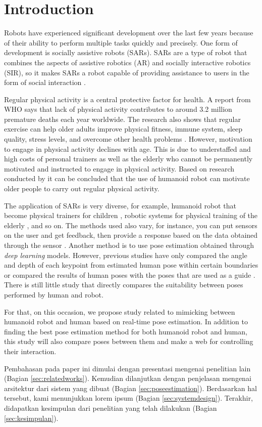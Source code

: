 \section{Introduction}
\label{sec:introduction}


Robots have experienced significant development over the last few years 
because of their ability to perform multiple tasks quickly and precisely.
One form of development is socially assistive robots (SARs). 
SARs are a type of robot that combines the aspects of assistive robotics (AR)
and socially interactive robotics (SIR), so it makes SARs a robot capable of providing assistance to users in the form of social interaction \citep{feil2005}.

Regular physical activity is a central protective factor for health.
A report from WHO says that lack of physical activity contributes to around 3.2 million premature deaths each year worldwide.
The research also shows that regular exercise can help older adults improve physical fitness, immune system, sleep quality, stress levels, and overcome other health problems \citep{lotfi2018}.
However, motivation to engage in physical activity declines with age. 
This is due to understaffed and high costs of personal trainers as well as the elderly who cannot be permanently motivated and instructed to engage in physical activity.
Based on research conducted by \citet{ruf2020} it can be concluded that the use of humanoid robot can motivate older people to carry out regular physical activity.

The application of SARs is very diverse, for example, humanoid robot that become physical trainers for children \citep{güneysu2017}, 
robotic systems for physical training of the elderly \citep{avioz2021}, and so on. The methods used also vary, for instance, 
you can put sensors on the user and get feedback, then provide a response based on the data obtained through the sensor \citep{güneysu2017}. 
Another method is to use pose estimation obtained through \emph{deep learning} models.
However, previous studies have only compared the angle and depth of each keypoint from estimated human pose within certain boundaries or compared the results of human poses with the poses that are used as a guide \citep{romeo}.
There is still little study that directly compares the suitability between poses performed by human and robot.

For that, on this occasion, we propose study related to mimicking between humanoid robot and human based on real-time pose estimation. 
In addition to finding the best pose estimation method for both humanoid robot and human, this study will also compare poses between them and make a web for controlling their interaction.

Pembahasan pada paper ini dimulai dengan presentasi mengenai penelitian lain (Bagian \ref{sec:relatedworks}).
Kemudian dilanjutkan dengan penjelasan mengenai arsitektur dari sistem yang dibuat (Bagian \ref{sec:poseestimation}).
Berdasarkan hal tersebut, kami menunjukkan lorem ipsum (Bagian \ref{sec:systemdesign}).
Terakhir, didapatkan kesimpulan dari penelitian yang telah dilakukan (Bagian \ref{sec:kesimpulan}).
